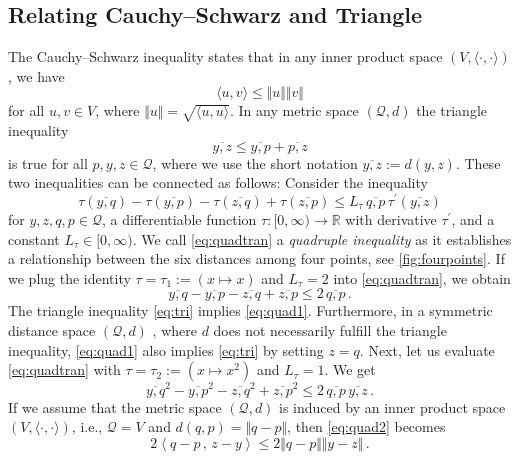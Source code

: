 \documentclass{article}
\newcommand*{\mc}[1]{\mathcal{#1}}
\newcommand{\R}{\mathbb{R}}
\newcommand{\Rp}{[0, \infty)} %
\newcommand{\pr}{^\prime}
\newcommand{\innerProduct}[2]{\left\langle#1\,,\, #2\right\rangle}
\newcommand{\ip}[2]{\innerProduct{#1}{#2}}
\newcommand{\normof}[1]{\Vert #1 \Vert}
\newcommand{\equationFullstop}{\, .}
\newcommand{\eqfs}{\equationFullstop}
\newcommand{\ol}[2]{\overline{#1,#2}}
\newcommand{\tran}{\tau}
\newcommand{\dtran}{\tran\pr}
\newcommand{\ctransymbol}{L}
\newcommand{\ctrano}[1]{\ctransymbol_{#1}}
\newcommand{\ctran}{\ctrano{\tran}}
\begin{document}
\subsection{Relating Cauchy--Schwarz and Triangle}
%
The Cauchy--Schwarz inequality states that in any inner product space $(V, \langle\cdot,\cdot\rangle)$, we have
\begin{equation}\label{eq:csi}
	\langle u,v \rangle \leq \normof{u} \normof{v}
\end{equation}
for all $u,v \in V$, where $ \normof{u} = \sqrt{\langle u,u \rangle}$. In any metric space $(\mc Q, d)$ the triangle inequality 
\begin{equation}\label{eq:tri}
	\ol yz \leq \ol yp + \ol pz
\end{equation}
is true for all $p,y,z\in\mc Q$, where we use the short notation $\ol yz := d(y,z)$. These two inequalities can be connected as follows: Consider the inequality
\begin{equation}\label{eq:quadtran}
	\tran(\ol yq)  - \tran(\ol yp) - \tran(\ol zq) + \tran(\ol zp) \leq \ctran\,  \ol qp \, \dtran(\ol yz)
\end{equation}
for $y,z,q,p\in\mc Q$, a differentiable function $\tran\colon[0,\infty)\to\R$ with derivative $\dtran$, and a constant $\ctran \in\Rp$. We call \eqref{eq:quadtran} a \textit{quadruple inequality} \cite{schoetz19} as it establishes a relationship between the six distances among four points, see \cref{fig:fourpoints}. If we plug the identity $\tran = \tran_1 := (x\mapsto x)$ and $\ctran = 2$ into \eqref{eq:quadtran}, we obtain
\begin{equation}\label{eq:quad1}
	\ol yq  - \ol yp - \ol zq + \ol zp \leq 2 \, \ol qp
	\eqfs
\end{equation}
The triangle inequality \eqref{eq:tri} implies \eqref{eq:quad1}. Furthermore, in a symmetric distance space $(\mc Q, d)$ \cite{deza16}, where $d$ does not necessarily fulfill the triangle inequality, \eqref{eq:quad1} also implies \eqref{eq:tri} by setting $z=q$. 
Next, let us evaluate \eqref{eq:quadtran} with $\tran = \tran_2 :=(x\mapsto x^2)$ and $\ctran = 1$. We get
\begin{equation}\label{eq:quad2}
	\ol yq^2 - \ol yp^2 - \ol zq^2 + \ol zp^2 \leq 2\, \ol qp\, \ol yz
	\eqfs
\end{equation}
If we assume that the metric space $(\mc Q, d)$ is induced by an inner product space $(V, \langle\cdot,\cdot\rangle)$, i.e., $\mc Q = V$ and $d(q,p) = \normof{q-p}$, then \eqref{eq:quad2} becomes
\begin{equation}
	2 \ip{q-p}{z-y} \leq 2 \normof{q-p}\normof{y-z}
	\eqfs
\end{equation}
\end{document}
